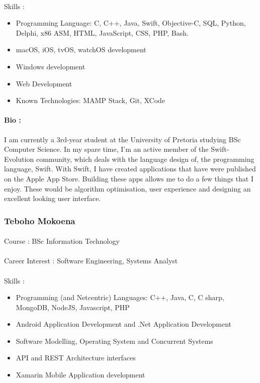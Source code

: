 \documentclass[11pt]{article}
\begin{document}
\paragraph{}Skills :
\begin{itemize}

\item Programming Language: C, C++, Java, Swift, Objective-C, SQL, Python, Delphi, x86 ASM, HTML, JavaScript, CSS, PHP, Bash.
\item macOS, iOS, tvOS, watchOS development
\item Windows development 
\item Web Development
\item Known Technologies: MAMP Stack, Git, XCode
\end{itemize}
\paragraph{Bio :}I am currently a 3rd-year student at the University of Pretoria studying BSc Computer Science. In my spare time, I'm an active member of the Swift-Evolution community, which deals with the language design of, the programming language, Swift. With Swift, I have created applications that have were published on the Apple App Store. Building these apps allows me to do a few things that I enjoy. These would be algorithm optimisation, user experience and designing an excellent looking user interface.

\subsubsection{Teboho Mokoena}
\paragraph{}Course : BSc Information Technology 
\paragraph{}Career Interest : Software Engineering, Systems Analyst
\paragraph{}Skills :
\begin{itemize}
\item Programming (and Netcentric) Languages: C++, Java, C, C sharp, MongoDB, NodeJS, Javascript, PHP
\item Android Application Development and .Net Application Development
\item Software Modelling, Operating System and Concurrent Systems
\item API and REST Architecture interfaces
\item Xamarin Mobile Application development
\end{itemize}
\end{document}
